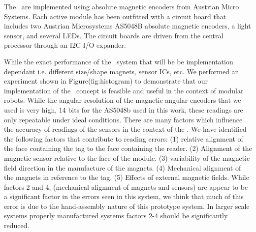 The \tagNamePlural~are implemented using absolute magnetic encoders from Austrian Micro Systems. Each active module has been outfitted with a circuit board that includes two Austrian Microsystems AS5048B absolute magnetic encoders, a light sensor, and several LEDs. The circuit boards are driven from the central processor through an I2C I/O expander.


While the exact performance of the \tagName~system that will be be implementation dependant i.e. different size/shape magnets, sensor ICs, etc. We performed an experiment shown in Figure(fig:histogram) to demonstrate that our implementation of the \tagName~concept is feasible and useful in the context of modular robots. While the angular resolution of the magnetic angular encoders that we used is very high, 14 bits for the AS5048b used in this work, these readings are only repeatable under ideal conditions. There are many factors which influence the accuracy of readings of the sensors in the context of the \tagNamePlural. We have identified the following factors that contribute to reading errors: (1) relative alignment of the face containing the tag to the face containing the reader. (2) Alignment of the magnetic sensor relative to the face of the module. (3) variability of the magnetic field direction in the manufacture of the magnets. (4) Mechanical alignment of the magnets in reference to the tag. (5) Effects of external magnetic fields. While factors 2 and 4, (mechanical alignment of magnets and sensors) are appear to be a significant factor in the errors seen in this system, we think that much of this error is due to the hand-assembly nature of this prototype system. In larger scale systems properly manufactured systems factors 2-4 should be significantly reduced.

